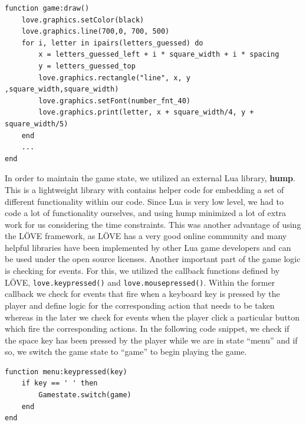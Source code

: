 \begin{lstlisting}[language={[5.2]Lua},caption=LuaLetterLizard \texttt{game:draw()} callback method, label=game]
function game:draw()
    love.graphics.setColor(black)
    love.graphics.line(700,0, 700, 500)
    for i, letter in ipairs(letters_guessed) do
        x = letters_guessed_left + i * square_width + i * spacing
        y = letters_guessed_top
        love.graphics.rectangle("line", x, y ,square_width,square_width)
        love.graphics.setFont(number_fnt_40)
        love.graphics.print(letter, x + square_width/4, y + square_width/5)
    end
    ...
end
\end{lstlisting}

In order to maintain the game state, we utilized an external Lua library, \textbf{hump}. This is a lightweight library with contains helper code for embedding a set of different functionality within our code. Since Lua is very low level, we had to code a lot of functionality ourselves, and using hump minimized a lot of extra work for us considering the time constraints. This was another advantage of using the L\"OVE framework, as L\"OVE has a very good online community and many helpful libraries have been implemented by other Lua game developers and can be used under the open source licenses.
Another important part of the game logic is checking for events. For this, we utilized the callback functions defined by L\"OVE, \texttt{love.keypressed()} and \texttt{love.mousepressed()}. Within the former callback we check for events that fire when a keyboard key is pressed by the player and define logic for the corresponding action that needs to be taken whereas in the later we check for events when the player click a particular button which fire the corresponding actions. In the following code snippet, we check if the space key has been pressed by the player while we are in state ``menu'' and if so, we switch the game state to ``game'' to begin playing the game.
	
\begin{lstlisting}[language={[5.2]Lua},caption=Handling the keypressed event in LuaLetterLizard,label=keypressed]
function menu:keypressed(key)
    if key == ' ' then
        Gamestate.switch(game)
    end
end
\end{lstlisting}
